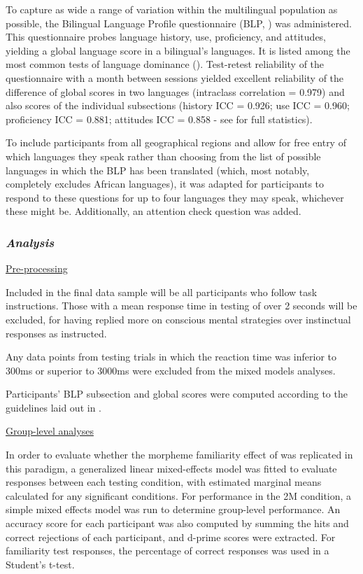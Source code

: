 \noindent
To capture as wide a range of variation within the multilingual population as possible, the Bilingual Language Profile questionnaire (BLP, \textcite{Gertken2014}) was administered. This questionnaire probes language history, use, proficiency, and attitudes, yielding a global language score in a bilingual's languages. It is listed among the most common tests of language dominance (\cite{Olson2023}). Test-retest reliability of the questionnaire with a month between sessions yielded excellent reliability of the difference of global scores in two languages (intraclass correlation = 0.979) and also scores of the individual subsections (history ICC = 0.926; use ICC = 0.960; proficiency ICC = 0.881; attitudes ICC = 0.858 - see \textcite{Olson2023} for full statistics).

To include participants from all geographical regions and allow for free entry of which languages they speak rather than choosing from the list of possible languages in which the BLP has been translated (which, most notably, completely excludes African languages), it was adapted for participants to respond to these questions for up to four languages they may speak, whichever these might be. Additionally, an attention check question was added.



\subsubsection{\large{\emph{Analysis}}}
\label{Analysis1}
\noindent \underline{Pre-processing}

\noindent
Included in the final data sample will be all participants who follow task instructions. Those with a mean response time in testing of over 2 seconds will be excluded, for having replied more on conscious mental strategies over instinctual responses as instructed.

Any data points from testing trials in which the reaction time was inferior to 300ms or superior to 3000ms were excluded from the mixed models analyses.

Participants' BLP subsection and global scores were computed according to the guidelines laid out in \textcite{Gertken2014}.

\noindent \underline{Group-level analyses}

\noindent
In order to evaluate whether the morpheme familiarity effect of \textcite{Lelonkiewicz2020} was replicated in this paradigm, a generalized linear mixed-effects model was fitted to evaluate responses between each testing condition, with estimated marginal means calculated for any significant conditions. For performance in the 2M condition, a simple mixed effects model was run to determine group-level performance. An accuracy score for each participant was also computed by summing the hits and correct rejections of each participant, and d-prime scores were extracted. For familiarity test responses, the percentage of correct responses was used in a Student's t-test.

